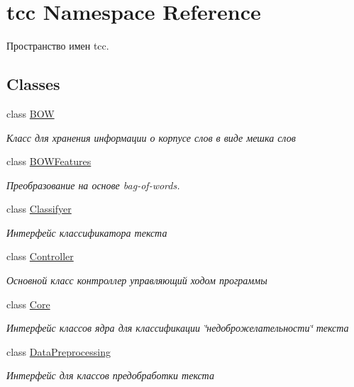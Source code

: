 \hypertarget{namespacetcc}{}\section{tcc Namespace Reference}
\label{namespacetcc}


Пространство имен tcc.  


\subsection*{Classes}
\begin{DoxyCompactItemize}
\item 
class \hyperlink{classtcc_1_1_b_o_w}{B\+OW}
\begin{DoxyCompactList}\small\item\em Класс для хранения информации о корпусе слов в виде мешка слов \end{DoxyCompactList}\item 
class \hyperlink{classtcc_1_1_b_o_w_features}{B\+O\+W\+Features}
\begin{DoxyCompactList}\small\item\em Преобразование на основе bag-\/of-\/words. \end{DoxyCompactList}\item 
class \hyperlink{classtcc_1_1_classifyer}{Classifyer}
\begin{DoxyCompactList}\small\item\em Интерфейс классификатора текста \end{DoxyCompactList}\item 
class \hyperlink{classtcc_1_1_controller}{Controller}
\begin{DoxyCompactList}\small\item\em Основной класс контроллер управляющий ходом программы \end{DoxyCompactList}\item 
class \hyperlink{classtcc_1_1_core}{Core}
\begin{DoxyCompactList}\small\item\em Интерфейс классов ядра для классификации \char`\"{}недоброжелательности\char`\"{} текста \end{DoxyCompactList}\item 
class \hyperlink{classtcc_1_1_data_preprocessing}{Data\+Preprocessing}
\begin{DoxyCompactList}\small\item\em Интерфейс для классов предобработки текста \end{DoxyCompactList}\item 

\end{DoxyCompactItemize}
